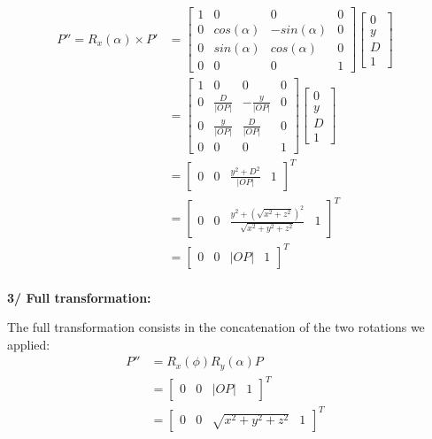 \documentclass[a4paper,10pt]{article}
\begin{document}
\begin{equation}
\left.\begin{aligned}
P'' = R_x(\alpha) \times P'
&=
\begin{bmatrix}
	1 & 0 			& 0 		   & 0 \\
	0 & cos(\alpha) & -sin(\alpha) & 0 \\
	0 & sin(\alpha) & cos(\alpha)  & 0 \\
	0 & 0 			& 0 		   & 1
\end{bmatrix}
\begin{bmatrix}
0 \\ y \\ D \\ 1
\end{bmatrix}&\\
&=
\begin{bmatrix}
	1 & 0 			   & 0 		         & 0 \\
	0 & \frac{D}{|OP|} & -\frac{y}{|OP|} & 0 \\
	0 & \frac{y}{|OP|} & \frac{D}{|OP|}  & 0 \\
	0 & 0 			   & 0 		         & 1
\end{bmatrix}
\begin{bmatrix}
0 \\ y \\ D \\ 1
\end{bmatrix}&\\
&=
\begin{bmatrix}
0 & 0 & \frac{y^2 + D^2}{|OP|} & 1
\end{bmatrix}^{T}&\\
&=
\begin{bmatrix}
0 & 0 & \frac{y^2 + (\sqrt{x^2 + z^2})^2}{\sqrt{x^2 + y^2 + z^2}} & 1
\end{bmatrix}^{T}&\\
&=
\begin{bmatrix}
0 & 0 & |OP| & 1
\end{bmatrix}^{T}&\\
\end{aligned}\right.
\end{equation}

\bigskip \bigskip \noindent
\textbf{3/ Full transformation:}

\bigskip \noindent
The full transformation consists in the concatenation of the two rotations we applied:
\begin{equation}
\left.\begin{aligned}
P'' &= R_x(\phi)R_y(\alpha)P&\\
&=
\begin{bmatrix}
0 & 0 & |OP| & 1
\end{bmatrix}^{T}&\\
&=
\begin{bmatrix}
0 & 0 & \sqrt{x^2 + y^2 + z^2} & 1
\end{bmatrix}^{T}&\\
\end{aligned}\right.
\end{equation}
\end{document}
